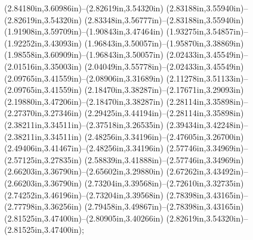 (2.84180in,3.60986in)--(2.82619in,3.54320in) (2.83188in,3.55940in)--(2.82619in,3.54320in) (2.83348in,3.56777in)--(2.83188in,3.55940in) (1.91908in,3.59709in)--(1.90843in,3.47464in) (1.93275in,3.54857in)--(1.92252in,3.43093in) (1.96843in,3.50057in)--(1.95870in,3.38869in) (1.98558in,3.60909in)--(1.96843in,3.50057in) (2.02433in,3.45549in)--(2.01516in,3.35003in) (2.04049in,3.55778in)--(2.02433in,3.45549in) (2.09765in,3.41559in)--(2.08906in,3.31689in) (2.11278in,3.51133in)--(2.09765in,3.41559in) (2.18470in,3.38287in)--(2.17671in,3.29093in) (2.19880in,3.47206in)--(2.18470in,3.38287in) (2.28114in,3.35898in)--(2.27370in,3.27346in) (2.29425in,3.44194in)--(2.28114in,3.35898in) (2.38211in,3.34511in)--(2.37518in,3.26535in) (2.39434in,3.42248in)--(2.38211in,3.34511in) (2.48256in,3.34196in)--(2.47605in,3.26700in) (2.49406in,3.41467in)--(2.48256in,3.34196in) (2.57746in,3.34969in)--(2.57125in,3.27835in) (2.58839in,3.41888in)--(2.57746in,3.34969in) (2.66203in,3.36790in)--(2.65602in,3.29880in) (2.67262in,3.43492in)--(2.66203in,3.36790in) (2.73204in,3.39568in)--(2.72610in,3.32735in) (2.74252in,3.46196in)--(2.73204in,3.39568in) (2.78398in,3.43165in)--(2.77798in,3.36256in) (2.79458in,3.49867in)--(2.78398in,3.43165in) (2.81525in,3.47400in)--(2.80905in,3.40266in) (2.82619in,3.54320in)--(2.81525in,3.47400in);
